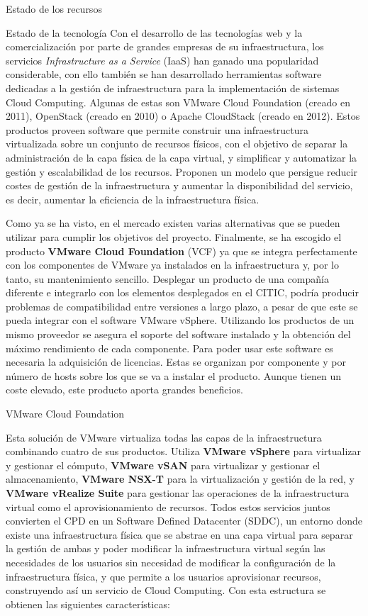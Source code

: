 \begin{chapter}{Estado de los recursos}
\begin{section}{Estado de la tecnología}
Con el desarrollo de las tecnologías web y la comercialización por parte de grandes empresas de su infraestructura, los servicios \textit{Infrastructure as a Service} (IaaS) han ganado una popularidad considerable, con ello también se han desarrollado herramientas software dedicadas a la gestión de infraestructura para la implementación de sistemas Cloud Computing. Algunas de estas son VMware Cloud Foundation (creado en 2011), OpenStack (creado en 2010) o Apache CloudStack (creado en 2012). Estos productos proveen software que permite construir una infraestructura virtualizada sobre un conjunto de recursos físicos, con el objetivo de separar la administración de la capa física de la capa virtual, y simplificar y automatizar la gestión y escalabilidad de los recursos. Proponen un modelo que persigue reducir costes de gestión de la infraestructura y aumentar la disponibilidad del servicio, es decir, aumentar la eficiencia de la infraestructura física.

Como ya se ha visto, en el mercado existen varias alternativas que se pueden utilizar para cumplir los objetivos del proyecto. Finalmente, se ha escogido el producto \textbf{VMware Cloud Foundation} (VCF) ya que se integra perfectamente con los componentes de VMware ya instalados en la infraestructura y, por lo tanto, su mantenimiento sencillo. Desplegar un producto de una compañía diferente e integrarlo con los elementos desplegados en el CITIC, podría producir problemas de compatibilidad entre versiones a largo plazo, a pesar de que este se pueda integrar con el software VMware vSphere. Utilizando los productos de un mismo proveedor se asegura el soporte del software instalado y la obtención del máximo rendimiento de cada componente.
Para poder usar este software es necesaria la adquisición de licencias. Estas se organizan por componente y por número de hosts sobre los que se va a instalar el producto. Aunque tienen un coste elevado, este producto aporta grandes beneficios.

\begin{subsection}{VMware Cloud Foundation}

    Esta solución de VMware virtualiza todas las capas de la infraestructura combinando cuatro de sus productos. Utiliza \textbf{VMware vSphere} para virtualizar y gestionar el cómputo, \textbf{VMware vSAN} para virtualizar y gestionar el almacenamiento, \textbf{VMware NSX-T} para la virtualización y gestión de la red, y \textbf{VMware vRealize Suite} para gestionar las operaciones de la infraestructura virtual como el aprovisionamiento de recursos. Todos estos servicios juntos convierten el CPD en un Software Defined Datacenter (SDDC), un entorno donde existe una infraestructura física que se abstrae en una capa virtual para separar la gestión de ambas y poder modificar la infraestructura virtual según las necesidades de los usuarios sin necesidad de modificar la configuración de la infraestructura física, y que permite a los usuarios aprovisionar recursos, construyendo así un servicio de Cloud Computing. Con esta estructura se obtienen las siguientes características:
    

\end{subsection}
\end{section}
\end{chapter}
